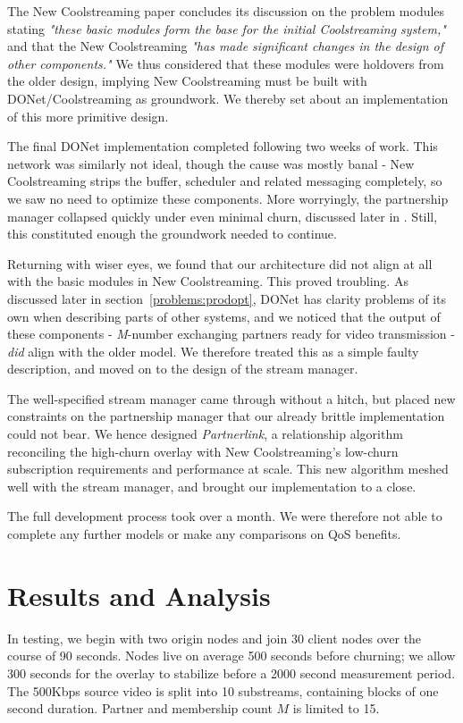 \documentclass[12pt,a4paper]{article}
\begin{document}
The New Coolstreaming paper concludes its discussion on the problem modules stating \textit{"these basic modules form the base for the initial Coolstreaming system,"} and that the New Coolstreaming \textit{"has made significant changes in the design of other components."} We thus considered that these modules were holdovers from the older design, implying New Coolstreaming must be built with  DONet/Coolstreaming as groundwork. We thereby set about an implementation of this more primitive design.

The final DONet implementation completed following two weeks of work. This network was similarly not ideal, though the cause was mostly banal - New Coolstreaming strips the buffer, scheduler and related messaging completely, so we saw no need to optimize these components. More worryingly, the partnership manager collapsed quickly under even minimal churn, discussed later in . Still, this constituted enough the groundwork needed to continue.

Returning with wiser eyes, we found that our architecture did not align at all with the basic modules in New Coolstreaming. This proved troubling. As discussed later in section~\ref{problems:prodopt}, DONet has clarity problems of its own when describing parts of other systems, and we noticed that the output of these components - \textit{M}-number exchanging partners ready for video transmission - \textit{did} align with the older model. We therefore treated this as a simple faulty description, and moved on to the design of the stream manager.

The well-specified stream manager came through without a hitch, but placed new constraints on the partnership manager that our already brittle implementation could not bear. We hence designed \textit{Partnerlink}, a relationship algorithm reconciling the high-churn overlay with New Coolstreaming's low-churn subscription requirements and performance at scale. This new algorithm meshed well with the stream manager, and brought our implementation to a close.

The full development process took over a month. We were therefore not able to complete any further models or make any comparisons on QoS benefits.

\section{Results and Analysis} \label{results}
In testing, we begin with two origin nodes and join 30 client nodes over the course of 90 seconds. Nodes live on average 500 seconds before churning; we allow 300 seconds for the overlay to stabilize before a 2000 second measurement period. The 500Kbps source video is split into 10 substreams, containing blocks of one second duration. Partner and membership count \(M\) is limited to 15.
\end{document}
